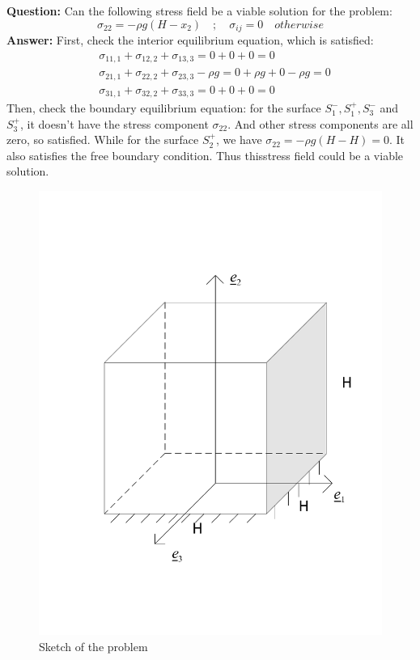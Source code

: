 \documentclass[letter,12pt]{article}
\begin{document}
\noindent \textbf{Question:} Can the following stress field be a viable solution for the problem:\\
\begin{equation}
\sigma_{22}=-\rho g (H-x_2) \quad ; \quad \sigma_{ij} =0 \quad otherwise
\end{equation} 
\noindent \textbf{Answer:} 
First, check the interior equilibrium equation, which is satisfied:
\begin{equation}
\begin{aligned}
& \sigma_{11,1}+\sigma_{12,2}+\sigma_{13,3}=0+0+0=0 \\
& \sigma_{21,1}+\sigma_{22,2}+\sigma_{23,3}-\rho g=0+\rho g+0-\rho g=0 \\
& \sigma_{31,1}+\sigma_{32,2}+\sigma_{33,3}=0+0+0=0
\end{aligned}
\end{equation}
Then, check the boundary equilibrium equation: for the surface $S_{1}^{-}, S_{1}^{+}, S_{3}^{-}$ and $S_{3}^{+}$, it doesn't have the stress component $\sigma_{22}$. And other stress components are all zero, so satisfied. While for the surface $S_{2}^{+}$, we have $\sigma_{22} = -\rho g (H-H) = 0$. It also satisfies the free boundary condition.
Thus thisstress field could be a viable solution.
\\


%
\begin{figure}[!h]
	\centering
	\includegraphics[width=0.5\linewidth]{./cube}
	\caption{Sketch of the problem}
\end{figure}
%


 
 
 


 
\end{document}
